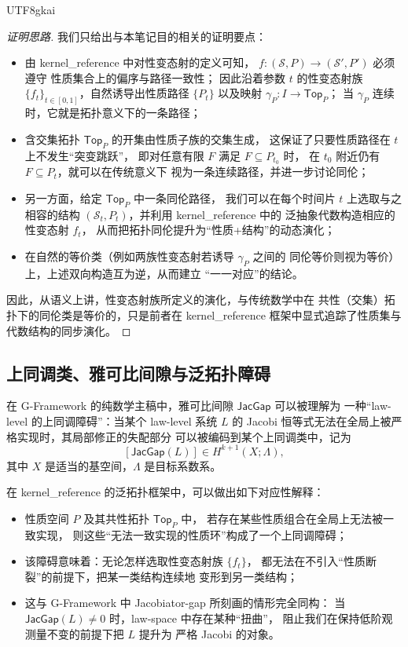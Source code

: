 \documentclass[12pt]{article}
\newcommand{\JacGap}{\mathsf{JacGap}}
\begin{document}
\begin{CJK*}{UTF8}{gkai}
\begin{proof}[证明思路]
我们只给出与本笔记目的相关的证明要点：
\begin{itemize}
  \item 由 kernel\_reference 中对性变态射的定义可知，
        $f:(\mathcal{S},P)\to(\mathcal{S}',P')$ 必须遵守
        性质集合上的偏序与路径一致性；
        因此沿着参数 $t$ 的性变态射族
        $\{f_t\}_{t\in[0,1]}$，自然诱导出性质路径
        $\{P_t\}$ 以及映射 $\gamma_P:I\to\mathsf{Top}_P$；
        当 $\gamma_P$ 连续时，它就是拓扑意义下的一条路径；
  \item 含交集拓扑 $\mathsf{Top}_P$ 的开集由性质子族的交集生成，
        这保证了只要性质路径在 $t$ 上不发生“突变跳跃”，
        即对任意有限 $F$ 满足 $F\subseteq P_{t_0}$ 时，
        在 $t_0$ 附近仍有 $F\subseteq P_t$，就可以在传统意义下
        视为一条连续路径，并进一步讨论同伦；
  \item 另一方面，给定 $\mathsf{Top}_P$ 中一条同伦路径，
        我们可以在每个时间片 $t$ 上选取与之相容的结构
        $(\mathcal{S}_t,P_t)$，并利用 kernel\_reference 中的
        泛抽象代数构造相应的性变态射 $f_t$，
        从而把拓扑同伦提升为“性质+结构”的动态演化；
  \item 在自然的等价类（例如两族性变态射若诱导 $\gamma_P$ 之间的
        同伦等价则视为等价）上，上述双向构造互为逆，从而建立
        “一一对应”的结论。
\end{itemize}
因此，从语义上讲，性变态射族所定义的演化，与传统数学中在
共性（交集）拓扑下的同伦类是等价的，只是前者在 kernel\_reference
框架中显式追踪了性质集与代数结构的同步演化。
\end{proof}

\subsection{上同调类、雅可比间隙与泛拓扑障碍}

在 G-Framework 的纯数学主稿中，雅可比间隙 $\JacGap$ 可以被理解为
一种“law-level 的上同调障碍”：当某个 law-level 系统 $L$ 的
Jacobi 恒等式无法在全局上被严格实现时，其局部修正的失配部分
可以被编码到某个上同调类中，记为
\[
  [\JacGap(L)]\in H^{k+1}(X;\Lambda),
\]
其中 $X$ 是适当的基空间，$\Lambda$ 是目标系数系。

在 kernel\_reference 的泛拓扑框架中，可以做出如下对应性解释：
\begin{itemize}
  \item 性质空间 $P$ 及其共性拓扑 $\mathsf{Top}_P$ 中，
        若存在某些性质组合在全局上无法被一致实现，
        则这些“无法一致实现的性质环”构成了一个上同调障碍；
  \item 该障碍意味着：无论怎样选取性变态射族 $\{f_t\}$，
        都无法在不引入“性质断裂”的前提下，把某一类结构连续地
        变形到另一类结构；
  \item 这与 G-Framework 中 Jacobiator-gap 所刻画的情形完全同构：
        当 $\JacGap(L)\neq 0$ 时，law-space 中存在某种“扭曲”，
        阻止我们在保持低阶观测量不变的前提下把 $L$ 提升为
        严格 Jacobi 的对象。
\end{itemize}


\end{CJK*}
\end{document}
